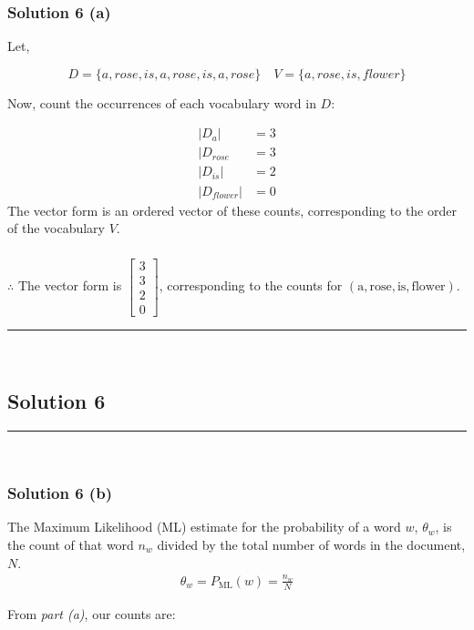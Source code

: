 \documentclass{article}
\begin{document}
\subsubsection*{Solution 6 (a)}
\begin{flushleft}
    Let,
\end{flushleft}

$$D = \{a,rose,is,a,rose,is,a,rose\} \quad V=\{a,rose,is,flower\}$$

\begin{flushleft}
    Now, count the occurrences of each vocabulary word in $D$:
\end{flushleft}
\begin{align*}
    |D_{a}| &= 3 \\
    |D_{rose} &= 3\\
    |D_{is}| &= 2 \\
    |D_{flower}| &= 0
\end{align*}
The vector form is an ordered vector of these counts, corresponding to the order of the vocabulary $V$.

\subsubsection*{\normalfont}{$\therefore$ The vector form is $\begin{bmatrix} 3 \\ 3 \\ 2 \\ 0 \end{bmatrix}$, corresponding to the counts for $(\mathrm{a}, \mathrm{rose}, \mathrm{is}, \mathrm{flower})$.} \\

\noindent\rule{\textwidth}{0.4pt}\\

\newpage

\subsection*{Solution 6}
\noindent\rule{\textwidth}{0.4pt}\\
\subsubsection*{Solution 6 (b)}
The Maximum Likelihood (ML) estimate for the probability of a word $w$, $\theta_w$, is the count of that word $n_w$ divided by the total number of words in the document, $N$.
\begin{align*}
    \theta_w = P_{\text{ML}}(w) = \frac{n_w}{N}
\end{align*}
\begin{flushleft}
    From \textit{part (a)}, our counts are:
\end{flushleft}
\end{document}
